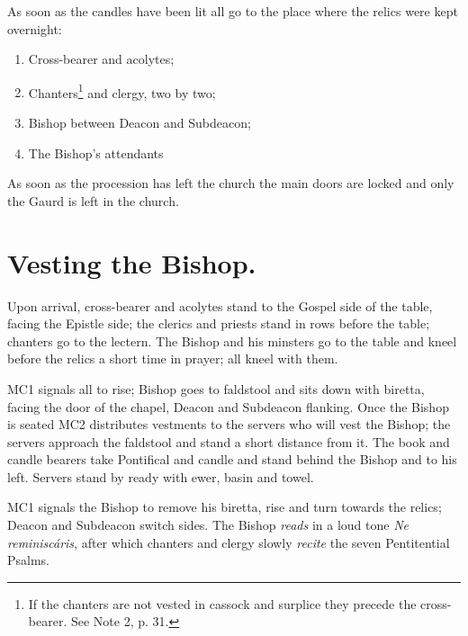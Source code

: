 \documentclass[letterpaper]{report}
\begin{document}
{    \rubric As soon as the candles have been lit all go to the place where the
    relics were kept overnight:

    \begin{enumerate}

        \item Cross-bearer and acolytes;

        \item Chanters\footnote{If the chanters are not vested in cassock and
            surplice they precede the cross-bearer. See \cite{consecranda} Note
            2, p. 31.} and clergy, two by two;

        \item Bishop between Deacon and Subdeacon;

        \item The Bishop's attendants

    \end{enumerate}

    As soon as the procession has left the church the main doors are locked and
    only the Gaurd is left in the church.

    \section{Vesting the Bishop.}

    \rubric Upon arrival, cross-bearer and acolytes stand to the Gospel side of
    the table, facing the Epistle side; the clerics and priests stand in rows
    before the table; chanters go to the lectern. The Bishop and his minsters
    go to the table and kneel before the relics a short time in prayer; all
    kneel with them.

    \rubric MC1 signals all to rise; Bishop goes to faldstool and sits down
    with biretta, facing the door of the chapel, Deacon and Subdeacon flanking.
    Once the Bishop is seated MC2 distributes vestments to the servers who will
    vest the Bishop; the servers approach the faldstool and stand a short
    distance from it. The book and candle bearers take Pontifical and candle
    and stand behind the Bishop and to his left. Servers stand by ready with
    ewer, basin and towel.

    \rubric MC1 signals the Bishop to remove his biretta, rise and turn towards
    the relics; Deacon and Subdeacon switch sides. The Bishop \textit{reads} in
    a loud tone \textit{Ne reminisc\'aris}, after which chanters and clergy
    slowly \textit{recite} the seven Pentitential Psalms.

}
\end{document}
